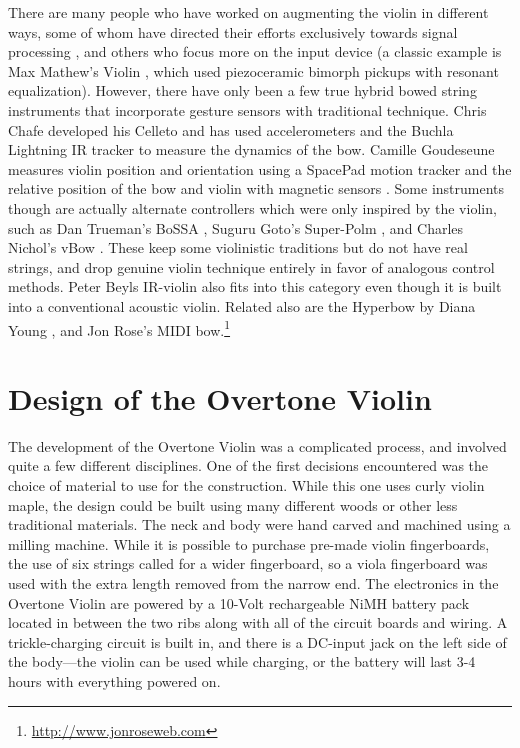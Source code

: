 There are many people who have worked on augmenting the violin in different
ways, some of whom have directed their efforts exclusively towards signal
processing \cite{Jehan:2001b,Poepel:2004,Serafin:1999}, and others who focus more on the input device (a classic
example is Max Mathew's Violin \cite{Mathews:1984}, which used piezoceramic bimorph pickups with
resonant equalization). However, there have only been a few true hybrid bowed
string instruments that incorporate gesture sensors with traditional technique.
Chris Chafe developed his Celleto \cite{Chadabe:1997} and has used accelerometers and the Buchla
Lightning IR tracker to measure the dynamics of the bow. Camille Goudeseune
measures violin position and orientation using a SpacePad motion tracker and the
relative position of the bow and violin with magnetic sensors \cite{Goudeseune:2001}. Some
instruments though are actually alternate controllers which were only inspired by
the violin, such as Dan Trueman's BoSSA \cite{Trueman:1999}, Suguru Goto's Super-Polm \cite{Pierrot:1997}, and
Charles Nichol's vBow \cite{Nichols:2003}. These keep some violinistic traditions but do not
have real strings, and drop genuine violin technique entirely in favor of
analogous control methods. Peter Beyls IR-violin \cite{Cutler:2000} also fits into this category
even though it is built into a conventional acoustic violin. Related also are the
Hyperbow by Diana Young \cite{Young:2002}, and Jon Rose's MIDI bow.\footnote{\url{http://www.jonroseweb.com}}

\section{Design of the Overtone Violin}

The development of the Overtone Violin was a complicated process, and involved
quite a few different disciplines. One of the first decisions encountered was the
choice of material to use for the construction. While this one uses curly violin
maple, the design could be built using many different woods or other less
traditional materials. The neck and body were hand carved and machined using a
milling machine. While it is possible to purchase pre-made violin fingerboards,
the use of six strings called for a wider fingerboard, so a viola fingerboard was
used with the extra length removed from the narrow end. The electronics in the
Overtone Violin are powered by a 10-Volt rechargeable NiMH battery pack located
in between the two ribs along with all of the circuit boards and wiring. A
trickle-charging circuit is built in, and there is a DC-input jack on the left
side of the body---the violin can be used while charging, or the battery will
last 3-4 hours with everything powered on.

